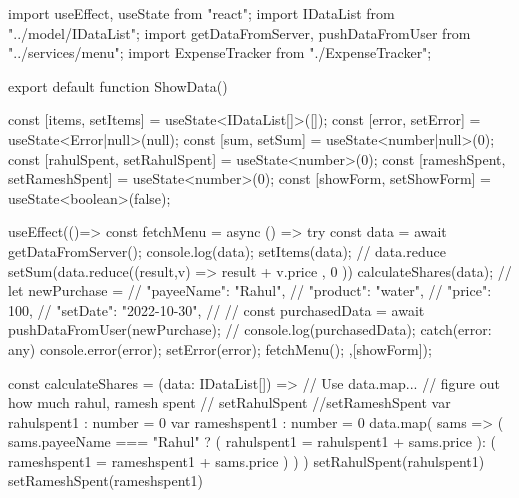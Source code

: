 import { useEffect, useState } from "react";
import IDataList from "../model/IDataList";
import { getDataFromServer, pushDataFromUser } from "../services/menu";
import ExpenseTracker from "./ExpenseTracker";

export default function ShowData(){

    const [items, setItems] = useState<IDataList[]>([]);
    const [error, setError] = useState<Error|null>(null);
    const [sum, setSum] = useState<number|null>(0);
    const [rahulSpent, setRahulSpent] =  useState<number>(0);
    const [rameshSpent, setRameshSpent] =  useState<number>(0);
    const [showForm, setShowForm] = useState<boolean>(false);

    useEffect(()=>{
        const fetchMenu = async () => {
            try{
                const data = await getDataFromServer();
                console.log(data);
                setItems(data);
                // data.reduce
                setSum(data.reduce((result,v) =>  result + v.price , 0 ))
                calculateShares(data);
                // let newPurchase = {
                //     "payeeName": "Rahul",
                //     "product": "water",
                //     "price": 100,
                //     "setDate": "2022-10-30",
                // }
                // const purchasedData = await pushDataFromUser(newPurchase);
                // console.log(purchasedData);
            }
            catch(error: any){
                console.error(error);
                setError(error);
            }
        }
        fetchMenu();
    },[showForm]);
 
    const calculateShares = (data: IDataList[]) => {
        // Use data.map... 
        // figure out how much rahul, ramesh spent
        // setRahulSpent
        //setRameshSpent
        var rahulspent1 : number = 0
        var rameshspent1 : number = 0
        data.map(
            sams => (
                sams.payeeName === "Rahul" ? (
                    rahulspent1 = rahulspent1 + sams.price
                ):
                (
                    rameshspent1 = rameshspent1 + sams.price
                )
            )
        )
        setRahulSpent(rahulspent1)
        setRameshSpent(rameshspent1)
    }
    

}
